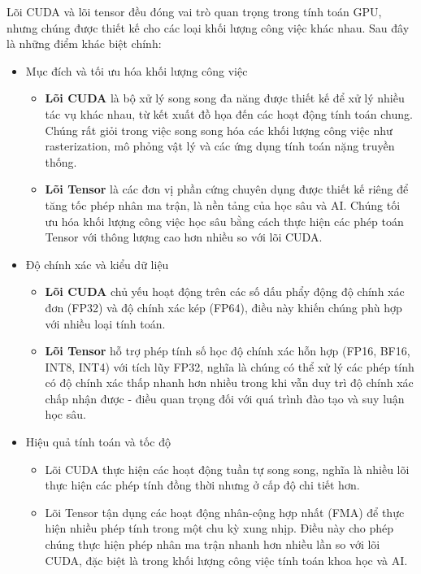 \documentclass[a4paper]{article}
\begin{document}
Lõi CUDA và lõi tensor đều đóng vai trò quan trọng trong tính toán GPU, nhưng chúng được thiết kế cho các loại khối lượng công việc khác nhau. Sau đây là những điểm khác biệt chính:
\begin{itemize}
    \item Mục đích và tối ưu hóa khối lượng công việc \par
    \begin{itemize}
        \item \textbf{Lõi CUDA} là bộ xử lý song song đa năng được thiết kế để xử lý nhiều tác vụ khác nhau, từ kết xuất đồ họa đến các hoạt động tính toán chung. Chúng rất giỏi trong việc song song hóa các khối lượng công việc như rasterization, mô phỏng vật lý và các ứng dụng tính toán nặng truyền thống.
        \item \textbf{Lõi Tensor} là các đơn vị phần cứng chuyên dụng được thiết kế riêng để tăng tốc phép nhân ma trận, là nền tảng của học sâu và AI. Chúng tối ưu hóa khối lượng công việc học sâu bằng cách thực hiện các phép toán Tensor với thông lượng cao hơn nhiều so với lõi CUDA.
    \end{itemize}
    \item Độ chính xác và kiểu dữ liệu\par
    \begin{itemize}
        \item \textbf{Lõi CUDA} chủ yếu hoạt động trên các số dấu phẩy động độ chính xác đơn (FP32) và độ chính xác kép (FP64), điều này khiến chúng phù hợp với nhiều loại tính toán.
        \item \textbf{Lõi Tensor} hỗ trợ phép tính số học độ chính xác hỗn hợp (FP16, BF16, INT8, INT4) với tích lũy FP32, nghĩa là chúng có thể xử lý các phép tính có độ chính xác thấp nhanh hơn nhiều trong khi vẫn duy trì độ chính xác chấp nhận được - điều quan trọng đối với quá trình đào tạo và suy luận học sâu.
    \end{itemize}
    \item Hiệu quả tính toán và tốc độ
    \begin{itemize}
        \item Lõi CUDA thực hiện các hoạt động tuần tự song song, nghĩa là nhiều lõi thực hiện các phép tính đồng thời nhưng ở cấp độ chi tiết hơn.
        \item Lõi Tensor tận dụng các hoạt động nhân-cộng hợp nhất (FMA) để thực hiện nhiều phép tính trong một chu kỳ xung nhịp. Điều này cho phép chúng thực hiện phép nhân ma trận nhanh hơn nhiều lần so với lõi CUDA, đặc biệt là trong khối lượng công việc tính toán khoa học và AI.

\end{itemize}
\end{itemize}
\end{document}
